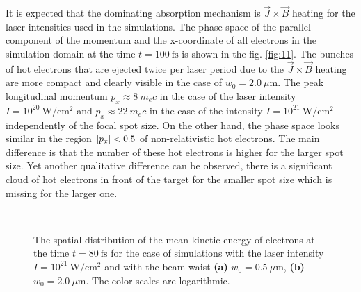 It is expected that the dominating absorption mechanism is $ \vec{J} \times \vec{B} $ heating for the laser intensities used in the simulations. The phase space of the parallel component of the momentum and the x-coordinate of all electrons in the simulation domain at the time $ t = 100 \ \mathrm{fs} $ is shown in the fig. \ref{fig:11}. The bunches of hot electrons that are ejected twice per laser period due to the $ \vec{J} \times \vec{B} $ heating are more compact and clearly visible in the case of $ w_0 = 2.0 \ \mu\mathrm{m} $. The peak longitudinal momentum $ p_x \approx 8 \ m_{e} c $ in the case of the laser intensity $ I = 10^{20} \ \mathrm{W/cm^2} $ and $ p_x \approx 22 \ m_{e} c $ in the case of the intensity $ I = 10^{21} \ \mathrm{W/cm^2} $ independently of the focal spot size. On the other hand, the phase space looks similar in the region $ \lvert p_x\rvert < 0.5 $ of non-relativistic hot electrons. The main difference is that the number of these hot electrons is higher for the larger spot size. Yet another qualitative difference can be observed, there is a significant cloud of hot electrons in front of the target for the smaller spot size which is missing for the larger one.

\begin{figure}[h!]
	\centering
	\\[2mm]
	\caption{The spatial distribution of the mean kinetic energy of electrons at the time $ t = 80 \ \mathrm{fs} $ for the case of simulations with the laser intensity $ I = 10^{21} \ \mathrm{W/cm^2} $ and with the beam waist \textbf{(a)} $ w_0 = 0.5 \ \mu\mathrm{m} $, \textbf{(b)} $ w_0 = 2.0 \ \mu\mathrm{m} $. The color scales are logarithmic.}
	\label{fig:17}
\end{figure}

